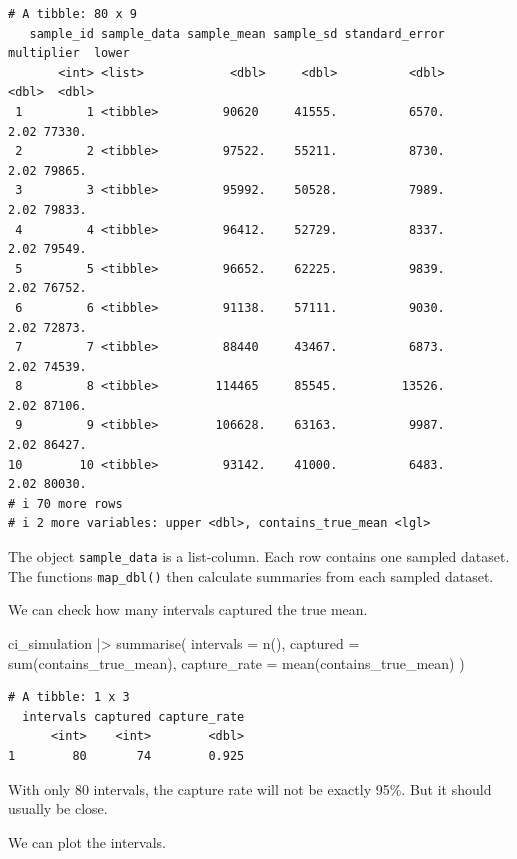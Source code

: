 \documentclass[
  letterpaper,
  DIV=11,
  numbers=noendperiod]{scrreprt}
\newenvironment{Shaded}{\begin{snugshade}}{\end{snugshade}}
\newcommand{\AttributeTok}[1]{\textcolor[rgb]{0.40,0.45,0.13}{#1}}
\newcommand{\FunctionTok}[1]{\textcolor[rgb]{0.28,0.35,0.67}{#1}}
\newcommand{\NormalTok}[1]{\textcolor[rgb]{0.00,0.23,0.31}{#1}}
\newcommand{\SpecialCharTok}[1]{\textcolor[rgb]{0.37,0.37,0.37}{#1}}
\begin{document}
\begin{verbatim}
# A tibble: 80 x 9
   sample_id sample_data sample_mean sample_sd standard_error multiplier  lower
       <int> <list>            <dbl>     <dbl>          <dbl>      <dbl>  <dbl>
 1         1 <tibble>         90620     41555.          6570.       2.02 77330.
 2         2 <tibble>         97522.    55211.          8730.       2.02 79865.
 3         3 <tibble>         95992.    50528.          7989.       2.02 79833.
 4         4 <tibble>         96412.    52729.          8337.       2.02 79549.
 5         5 <tibble>         96652.    62225.          9839.       2.02 76752.
 6         6 <tibble>         91138.    57111.          9030.       2.02 72873.
 7         7 <tibble>         88440     43467.          6873.       2.02 74539.
 8         8 <tibble>        114465     85545.         13526.       2.02 87106.
 9         9 <tibble>        106628.    63163.          9987.       2.02 86427.
10        10 <tibble>         93142.    41000.          6483.       2.02 80030.
# i 70 more rows
# i 2 more variables: upper <dbl>, contains_true_mean <lgl>
\end{verbatim}

The object \texttt{sample\_data} is a list-column. Each row contains one
sampled dataset. The functions \texttt{map\_dbl()} then calculate
summaries from each sampled dataset.

We can check how many intervals captured the true mean.

\begin{Shaded}
\begin{Highlighting}[]
\NormalTok{ci\_simulation }\SpecialCharTok{|\textgreater{}}
  \FunctionTok{summarise}\NormalTok{(}
    \AttributeTok{intervals =} \FunctionTok{n}\NormalTok{(),}
    \AttributeTok{captured =} \FunctionTok{sum}\NormalTok{(contains\_true\_mean),}
    \AttributeTok{capture\_rate =} \FunctionTok{mean}\NormalTok{(contains\_true\_mean)}
\NormalTok{  )}
\end{Highlighting}
\end{Shaded}

\begin{verbatim}
# A tibble: 1 x 3
  intervals captured capture_rate
      <int>    <int>        <dbl>
1        80       74        0.925
\end{verbatim}

With only 80 intervals, the capture rate will not be exactly 95\%. But
it should usually be close.

We can plot the intervals.
\end{document}
